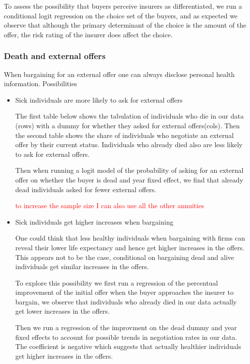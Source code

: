 \documentclass[12pt]{article}
\begin{document}


To assess the possibility that buyers perceive insurers as differentiated, we run a conditional logit regression on the choice set of the buyers, and as expected we observe that although the primary determinant of the choice is the amount of the offer, the risk rating of the insurer does affect the choice. 

\subsubsection{Death and external offers}
When bargaining for an external offer one can always disclose personal health information. Possibilities 
\begin{itemize}
    \item Sick individuals are more likely to ask for external offers
    
    The first table below shows the tabulation of individuals who die in our data (rows) with  a dummy for whether they asked for external offers(cols). Then the second table shows the share of individuals who negotiate an external offer by their current status. Individuals who already died also are less likely to ask for external offers. 

    
    Then when running a logit model of the probability of asking for an external offer on whether the buyer is dead and year fixed effect, we find that already dead individuals asked for fewer external offers. 

    \textcolor{red}{ to increase the sample size I can also use all the other annuities}






\newpage
    \item Sick individuals get higher increases when bargaining 
    
    One could think that less healthy individuals when bargaining with firms can reveal their lower life expectancy and hence get higher increases in the offers. This appears not to be the case, conditional on bargaining dead and alive individuals get similar increases in the offers. 

    To explore this possibility we first run a regression of the percentual improvement of the initial offer when the buyer approaches the insurer to bargain, we observe that individuals who already died in our data actually get lower increases in the offers. 

    Then we run a regression of the improvment on the dead dummy and year fixed effects to account for possible trends in negotiation rates in our data. The coefficient is negative which suggests that actually healthier individuals get higher increases in the offers.

    

    


\end{itemize}
\end{document}
